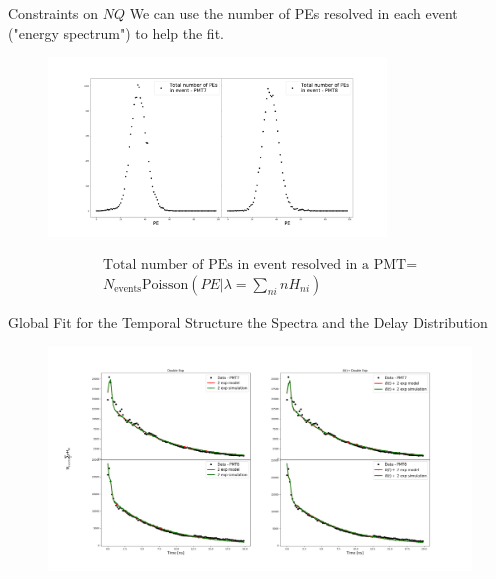 \documentclass{beamer}
\begin{document}
\begin{frame}{Constraints on $NQ$}
We can use the number of PEs resolved in each event ("energy spectrum") to help the fit.
\begin{figure}[h]
\includegraphics[width=0.8\textwidth]{totalPE.png}
\end{figure}
\begin{equation}
\begin{split}
\text{Total number of PEs in event resolved in a PMT}=\\
N_{\text{events}}\text{Poisson}\left(PE|\lambda=\sum_{ni}nH_{ni}\right)
\end{split}
\end{equation}
\end{frame}

\begin{frame}{Global Fit for the Temporal Structure the Spectra and the Delay Distribution}
\begin{figure}[h]
\includegraphics[width=1\textwidth]{fitB.png}
\end{figure}
\end{frame}
\end{document}
